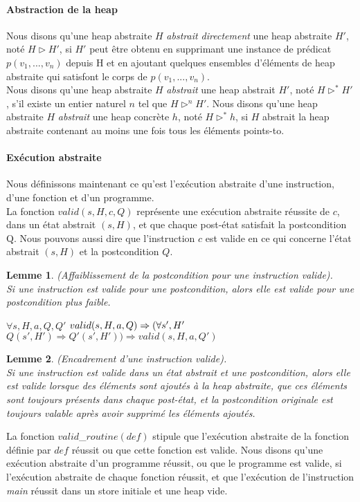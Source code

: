 \documentclass[11pt,openany]{article}
\newtheorem{lemme}{Lemme}
\begin{document}
			\paragraph{Abstraction de la heap}
		Nous disons qu'une heap abstraite $H$ \textit{abstrait directement} une heap abstraite $H'$, not\'e $H \rhd H'$, si $H'$ peut \^etre obtenu en supprimant une instance de pr\'edicat $p(v_1,...,v_n)$ depuis H et en ajoutant quelques ensembles d'\'el\'ements de heap abstraite qui satisfont le corps de $p(v_1,...,v_n)$.\\
		Nous disons qu'une heap abstraite $H$ \textit{abstrait} une heap abstrait $H'$, not\'e $H\rhd^* H'$, s'il existe un entier naturel $n$ tel que $H\rhd^n H'$.
		Nous disons qu'une heap abstraite $H$ \textit{abstrait} une heap concr\`ete $h$, not\'e $H\rhd^* h$, si $H$ abstrait la heap abstraite contenant au moins une fois tous les \'el\'ements points-to.\\
			\paragraph{Ex\'ecution abstraite}
		Nous d\'efinissons maintenant ce qu'est l'ex\'ecution abstraite d'une instruction, d'une fonction et d'un programme.\\
		La fonction $valid(s,H,c,Q)$ repr\'esente une ex\'ecution abstraite  r\'eussite de $c$, dans un \'etat abstrait $(s,H)$, et que chaque post-\'etat satisfait la postcondition Q. Nous pouvons aussi dire que l'instruction $c$ est valide en ce qui concerne l'\'etat abstrait $(s,H)$ et la postcondition $Q$.
		\begin{lemme}
			(Affaiblissement de la postcondition pour une instruction valide).\\
			Si une instruction est valide pour une postcondition, alors elle est valide pour une postcondition plus faible.
			
$\forall s,H,a,Q,Q'$ $valid(s,H,a,Q)\Rightarrow\\(\forall s', H'$ $Q(s',H')\Rightarrow Q'(s',H'))\Rightarrow valid(s,H,a,Q')$
		\end{lemme}
		
		\begin{lemme}
			(Encadrement d'une instruction valide).\\
			Si une instruction est valide dans un \'etat abstrait et une postcondition, alors elle est valide lorsque des \'el\'ements sont ajout\'es \`a la heap abstraite, que ces \'el\'ements sont toujours pr\'esents dans chaque post-\'etat, et la postcondition originale est toujours valable apr\`es avoir supprim\'e les \'el\'ements ajout\'es.
		\end{lemme}
		La fonction $valid$_$routine(def)$ stipule que l'ex\'ecution abstraite de la fonction d\'efinie par $def$ r\'eussit ou que cette fonction est valide. Nous disons qu'une ex\'ecution abstraite d'un programme r\'eussit, ou que le programme est valide, si l'ex\'ecution abstraite de chaque fonction r\'eussit, et que l'ex\'ecution de l'instruction \textit{main} r\'eussit dans un store initiale et une heap vide.\\
\end{document}
